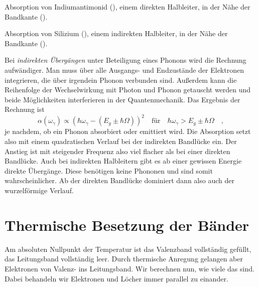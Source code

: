 \begin{marginfigure}[-70mm]
    \caption{Absorption von Indiumantimonid (), einem direkten Halbleiter, in der Nähe der Bandkante (\cite{Johnson1967}).}
\end{marginfigure}

\begin{marginfigure}
    \caption{Absorption von Silizium (), einem indirekten Halbleiter, in der Nähe der Bandkante (\cite{Macfarlane1955}).}
\end{marginfigure}


Bei \emph{indirekten Übergängen} unter Beteiligung eines Phonons wird die Rechnung aufwändiger. Man muss über alle Ausgangs- und Endzustände der Elektronen integrieren, die über irgendein Phonon verbunden sind.  Außerdem kann die Reihenfolge der Wechselwirkung mit Photon und Phonon getauscht werden und beide Möglichkeiten interferieren in der Quantenmechanik. Das Ergebnis der Rechnung ist 
\begin{equation}
    \alpha(\omega_\gamma) \propto \left( \hbar \omega_\gamma -( E_g  \pm \hbar \Omega) \right)^2 \quad \text{für} \quad 
    \hbar \omega_\gamma >  E_g  \pm \hbar \Omega \quad ,
\end{equation}
je nachdem, ob ein Phonon absorbiert oder emittiert wird.
Die Absorption setzt also mit einem quadratischen Verlauf bei der indirekten Bandlücke ein. Der Anstieg ist mit steigender Frequenz also viel flacher als bei einer direkten Bandlücke. Auch bei indirekten Halbleitern gibt es ab einer gewissen Energie direkte Übergänge. Diese benötigen keine Phononen und sind somit wahrscheinlicher. Ab der direkten Bandlücke dominiert dann also auch der wurzelförmige Verlauf.



\section{Thermische Besetzung der Bänder}

Am absoluten Nullpunkt der Temperatur ist das Valenzband vollständig gefüllt, das Leitungsband vollständig leer. Durch thermische Anregung gelangen aber Elektronen von Valenz- ins Leitungsband. Wir berechnen nun, wie viele das sind. Dabei behandeln wir Elektronen und Löcher immer parallel zu einander.


